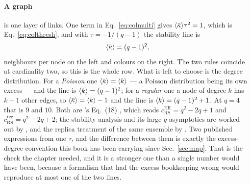 \paragraph{A graph} is one layer of links. One term in
Eq.~\eqref{eq:colmulti} gives $\langle \bar\kappa \rangle\tau^{2}=1$, which is
Eq.~\eqref{eq:colthresh}, and with $\tau=-1/(q-1)$ the stability line is
\begin{equation}
  \langle \bar\kappa \rangle=(q-1)^{2},
  \label{eq:colgraphline}
\end{equation}
neighbours per node on the left and colours on the right. The two rules
coincide at cardinality two, so this is the whole row. What is left to choose is
the degree distribution. For a \emph{Poisson} one $\langle \bar\kappa \rangle=\langle k \rangle$ --- a
Poisson distribution being its own excess --- and the line is
$\langle k \rangle=(q-1)^{2}$; for a \emph{regular} one a node of degree $k$ has $k-1$
other edges, so $\langle \bar\kappa \rangle=\langle k \rangle-1$ and the line is
$\langle k \rangle=(q-1)^{2}+1$. At $q=4$ that is $9$ and $10$. Both are
\citeauthor{zdeborova2007}'s Eq.~(18) \citep{zdeborova2007}, which reads
$c_{\mathrm{RS}}^{\mathrm{ER}}=q^{2}-2q+1$ and
$c_{\mathrm{RS}}^{\mathrm{reg}}=q^{2}-2q+2$; the stability analysis and its
large-$q$ asymptotics are worked out by \citet{krzakala2004}, and the replica
treatment of the same ensemble by \citet{vanmourik2002}. Two published
expressions from one $\tau$, and the difference between them is exactly the
excess-degree convention this book has been carrying since Sec.~\ref{sec:map}.
That is the check the chapter needed, and it is a stronger one than a single
number would have been, because a formalism that had the excess bookkeeping
wrong would reproduce at most one of the two lines.

